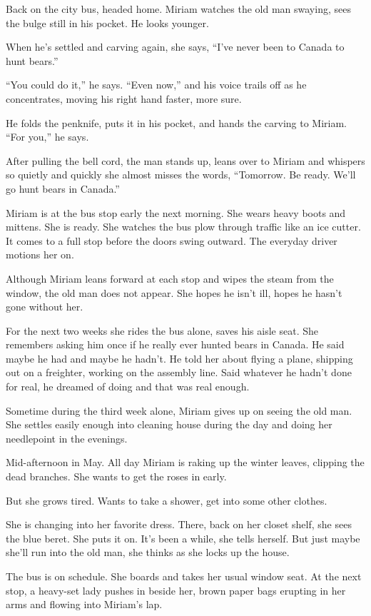 \documentclass[
]{article}
\begin{document}
Back on the city bus, headed home. Miriam watches the old man swaying,
sees the bulge still in his pocket. He looks younger.

When he's settled and carving again, she says, ``I've never been to
Canada to hunt bears.''

``You could do it,'' he says. ``Even now,'' and his voice trails off as
he concentrates, moving his right hand faster, more sure.

He folds the penknife, puts it in his pocket, and hands the carving to
Miriam. ``For you,'' he says.

After pulling the bell cord, the man stands up, leans over to Miriam and
whispers so quietly and quickly she almost misses the words, ``Tomorrow.
Be ready. We'll go hunt bears in Canada.''

Miriam is at the bus stop early the next morning. She wears heavy boots
and mittens. She is ready. She watches the bus plow through traffic like
an ice cutter. It comes to a full stop before the doors swing outward.
The everyday driver motions her on.

Although Miriam leans forward at each stop and wipes the steam from the
window, the old man does not appear. She hopes he isn't ill, hopes he
hasn't gone without her.

For the next two weeks she rides the bus alone, saves his aisle seat.
She remembers asking him once if he really ever hunted bears in Canada.
He said maybe he had and maybe he hadn't. He told her about flying a
plane, shipping out on a freighter, working on the assembly line. Said
whatever he hadn't done for real, he dreamed of doing and that was real
enough.

Sometime during the third week alone, Miriam gives up on seeing the old
man. She settles easily enough into cleaning house during the day and
doing her needlepoint in the evenings.

Mid-afternoon in May. All day Miriam is raking up the winter leaves,
clipping the dead branches. She wants to get the roses in early.

But she grows tired. Wants to take a shower, get into some other
clothes.

She is changing into her favorite dress. There, back on her closet
shelf, she sees the blue beret. She puts it on. It's been a while, she
tells herself. But just maybe she'll run into the old man, she thinks as
she locks up the house.

The bus is on schedule. She boards and takes her usual window seat. At
the next stop, a heavy-set lady pushes in beside her, brown paper bags
erupting in her arms and flowing into Miriam's lap.
\end{document}
